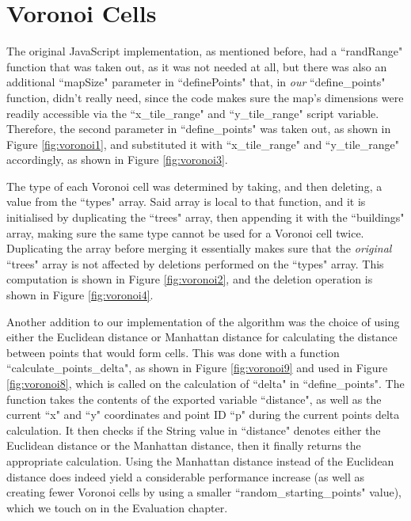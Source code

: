\section{Voronoi Cells}

The original JavaScript implementation, as mentioned before, had a ``randRange" function that was taken out, as it was not needed at all, but there was also an additional ``mapSize" parameter in ``definePoints" that, in \textit{our} ``define\_points" function, didn't really need, since the code makes sure the map's dimensions were readily accessible via the ``x\_tile\_range" and ``y\_tile\_range" script variable. Therefore, the second parameter in ``define\_points" was taken out, as shown in Figure \ref{fig:voronoi1}, and substituted it with ``x\_tile\_range" and ``y\_tile\_range" accordingly, as shown in Figure \ref{fig:voronoi3}.

The type of each Voronoi cell was determined by taking, and then deleting, a value from the ``types" array. Said array is local to that function, and it is initialised by duplicating the ``trees" array, then appending it with the ``buildings" array, making sure the same type cannot be used for a Voronoi cell twice. Duplicating the array before merging it essentially makes sure that the \textit{original} ``trees" array is not affected by deletions performed on the ``types" array. This computation is shown in Figure \ref{fig:voronoi2}, and the deletion operation is shown in Figure \ref{fig:voronoi4}.

Another addition to our implementation of the algorithm was the choice of using either the Euclidean distance or Manhattan distance for calculating the distance between points that would form cells. This was done with a function ``calculate\_points\_delta", as shown in Figure \ref{fig:voronoi9} and used in Figure \ref{fig:voronoi8}, which is called on the calculation of ``delta" in ``define\_points". The function takes the contents of the exported variable ``distance", as well as the current ``x" and ``y" coordinates and point ID ``p" during the current points delta calculation. It then checks if the String value in ``distance" denotes either the Euclidean distance or the Manhattan distance, then it finally returns the appropriate calculation. Using the Manhattan distance instead of the Euclidean distance does indeed yield a considerable performance increase (as well as creating fewer Voronoi cells by using a smaller ``random\_starting\_points" value), which we touch on in the Evaluation chapter.

